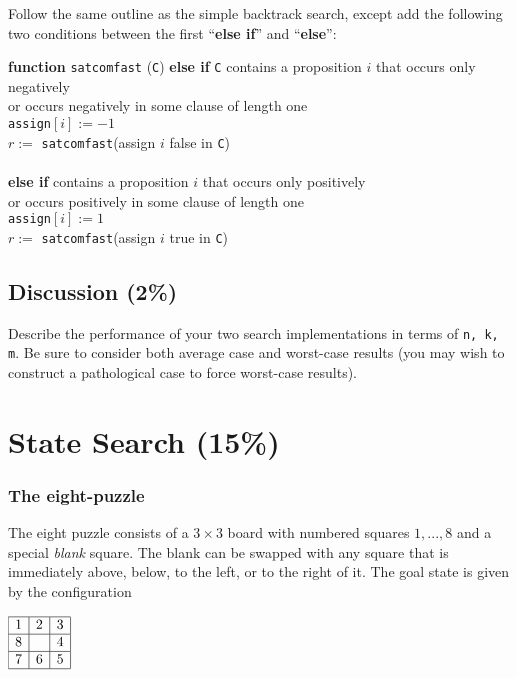 \documentclass[12pt]{article}
\begin{document}
\noindent
Follow the same outline as the simple backtrack search,
except add the following two conditions
between the first ``{\bf else if}'' and ``{\bf else}'':


\begin{tabbing}
{\bf fu}\={\bf nction} {\tt satcomfast} ({\tt C})
\kill
\> {\bf else if}
\={\tt C} contains a proposition $i$ that occurs only negatively \\
\>\> or occurs negatively in some clause of length one 
\\
\>\> {\tt assign}$[i] := -1$
\\
\>\> $r :=$ {\tt satcomfast}(assign $i$ false in {\tt C})
\\
\\
\> {\bf else if}
 contains a proposition $i$ that occurs only positively \\
\>\> or occurs positively in some clause of length one 
\\
\>\> {\tt assign}$[i] := 1$
\\
\>\> $r :=$ {\tt satcomfast}(assign $i$ true in {\tt C})
\end{tabbing}
 
 \subsection{Discussion \rm(2\%)}
 Describe the performance of your two search implementations in terms of {\tt n, k, m}. Be sure to consider both average case and worst-case results (you may wish to construct a pathological case to force worst-case results).
 
\newpage

\section{State Search \rm(15\%)}


\subsubsection*{The eight-puzzle}

\noindent
The eight puzzle consists of a $3\times 3$ board with numbered 
squares $1,...,8$ and a special {\em blank\/} square.
The blank can be swapped with any square that is immediately above, below, 
to the left, or to the right of it.
The goal state is given by the configuration
%
\begin{center}
$\begin{array}[t]{|c|c|c|}\hline
1 & 2 & 3 \\\hline
8 &   & 4 \\\hline
7 & 6 & 5 \\\hline
\end{array}$
\end{center}
\end{document}
